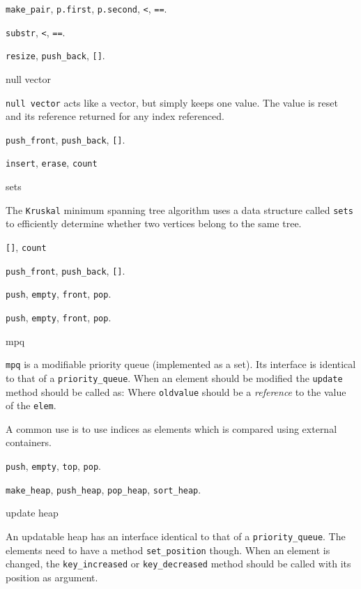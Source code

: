 \categorycontents{}
\newpage

 {\tt make\_pair}, {\tt p.first}, {\tt p.second}, {\tt <}, {\tt ==}.


 {\tt substr}, {\tt <}, {\tt ==}.


 {\tt resize}, {\tt push\_back}, {\tt []}.
\begin{algorithm}{null vector}

{\tt null vector} acts like a vector, but simply keeps one value.
The value is reset and its reference returned for any index referenced.
\end{algorithm}


 {\tt push\_front}, {\tt push\_back}, {\tt []}.


 {\tt insert}, {\tt erase}, {\tt count}
\begin{algorithm}{sets}

The {\tt Kruskal} minimum spanning tree algorithm uses a data structure
called {\tt sets} to efficiently determine whether two vertices belong to
the same tree.
\end{algorithm}


 {\tt []}, {\tt count}


 {\tt push\_front}, {\tt push\_back}, {\tt []}.


 {\tt push}, {\tt empty}, {\tt front}, {\tt pop}.

 {\tt push}, {\tt empty}, {\tt front}, {\tt pop}.
\begin{algorithm}{mpq}

{\tt mpq} is a modifiable priority queue (implemented as a set). Its interface
is identical to that of a {\tt priority\_queue}. When an element should be
modified the {\tt update} method should be called as:
Where {\tt oldvalue} should be a \emph{reference} to the value of the
{\tt elem}.

A common use is to use indices as elements which is compared using external
containers.
\end{algorithm}

 {\tt push}, {\tt empty}, {\tt top}, {\tt pop}.

 {\tt make\_heap}, {\tt push\_heap}, {\tt pop\_heap}, {\tt sort\_heap}.
\begin{algorithm}{update heap}

An updatable heap has an interface identical to that of a
{\tt priority\_queue}.
The elements need to have a method {\tt set\_position} though. When an element
is changed, the {\tt key\_increased} or {\tt key\_decreased} method should
be called with its position as argument.
\end{algorithm}

\begin{sourceslandscape}
\end{sourceslandscape}
